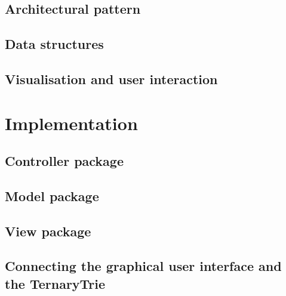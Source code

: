 \documentclass[a4paper,11pt]{article}
\begin{document}
\subsection{Architectural pattern}
\label{sub:Design Pattern}


\subsection{Data structures}


\subsection{Visualisation and user interaction}


\pagebreak
\section{Implementation}
\label{sec:Implementation}


\subsection{Controller package} %


\subsection{Model package} %


\subsection{View package} %


\subsection{Connecting the graphical user interface and the TernaryTrie}

\end{document}
